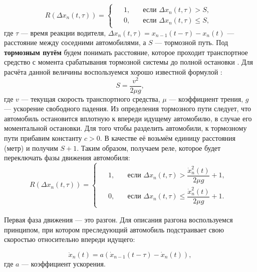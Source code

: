 \documentclass[12pt, a4paper]{extarticle}
\numberwithin{equation}{section}
\numberwithin{figure}{section}
\begin{document}
\begin{equation*}
R(\Delta x_{n}(t,\tau))=
\begin{cases}
\begin{split}
&1,\quad &\text{если }\Delta x_{n}(t,\tau) >S, \\
&0,\quad &\text{если }\Delta x_{n}(t,\tau) \leq S,
\end{split}
\end{cases}
\end{equation*}
где $\tau$ --- время реакции водителя, $\Delta x_{n}(t,\tau)=x_{n-1}(t-\tau)-x_n(t)$ --- расстояние между соседними автомобилями, а $S$ --- тормозной путь. Под \textbf{тормозным путём} будем понимать расстояние, которое проходит транспортное средство с момента срабатывания тормозной системы до полной остановки \cite{PDD}. Для расчёта данной величины воспользуемся хорошо известной формулой \cite{Physics}:
\begin{equation*} 
S=\dfrac{v^2}{2\mu g},
\end{equation*}
где $v$ --- текущая скорость транспортного средства, $\mu$ --- коэффициент трения, $g$ --- ускорение свободного падения. Из определения тормозного пути следует, что автомобиль остановится вплотную к впереди идущему автомобилю, в случае его моментальной остановки. Для того чтобы разделить автомобили, к тормозному пути прибавим константу $c > 0$. В качестве её возьмём единицу расстояния (метр) и получим $S+1$. Таким образом, получаем реле, которое будет переключать фазы движения автомобиля:
\begin{equation}\label{rele}
R(\Delta x_{n}(t,\tau))=
\begin{cases}
\begin{split}
&1,\quad &\text{если }\Delta x_{n}(t,\tau) > \dfrac{\dot{x}_n^2(t)}{2\mu g}+1, \\
&0,\quad &\text{если }\Delta x_{n}(t,\tau) \leq \dfrac{\dot{x}_n^2(t)}{2\mu g}+1.
\end{split}
\end{cases}
\end{equation}

Первая фаза движения --- это разгон. Для описания разгона воспользуемся принципом, при котором преследующий автомобиль подстраивает свою скоростью относительно впереди идущего:

\begin{equation*}
\ddot{x}_n(t)= a(\dot{x}_{n-1}(t-\tau)-\dot{x}_n(t)),
\end{equation*}
где $a$ --- коэффициент ускорения.
\end{document}
